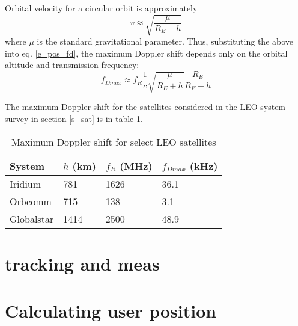 Orbital velocity for a circular orbit is approximately
\begin{equation*}
    v \approx \sqrt{\frac{\mu}{R_E + h}}
\end{equation*}
where $\mu$ is the standard gravitational parameter. Thus, substituting the above into eq. \ref{e_pos_fd}, the maximum Doppler shift depends only on the orbital altitude and transmission frequency:
\begin{equation}
    \label{e_pos_fd_max}
    f_{D max} \approx f_R \frac{1}{c} \sqrt{\frac{\mu}{R_E + h}} \frac{R_E}{R_E + h}
\end{equation}

The maximum Doppler shift for the satellites considered in the LEO system survey in section \ref{s_sat} is in table \ref{t_pos_max_fd}.

\begin{table}
    \centering
    \begin{tabular}{llll}
    System     & $h$ (km) &  $f_R$ (MHz) & $f_{Dmax}$ (kHz) \\ \hline
    Iridium    &  781  &  1626 & \num{36.1} \\
    Orbcomm    &  715  &  138  & \num{3.1} \\
    Globalstar &  1414 &  2500 & \num{48.9}
    \end{tabular}
    \caption{Maximum Doppler shift for select LEO satellites}
    \label{t_pos_max_fd}
\end{table}

\section{tracking and meas}

\section{Calculating user position}




